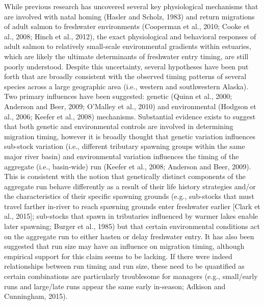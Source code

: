 \documentclass[12pt,]{book}
\theoremstyle{definition}
\theoremstyle{definition}
\theoremstyle{definition}
\theoremstyle{remark}
\begin{document}
While previous research has uncovered several key physiological
mechanisms that are involved with natal homing (Hasler and Scholz, 1983)
and return migrations of adult salmon to freshwater environments
(Cooperman et al., 2010; Cooke et al., 2008; Hinch et al., 2012), the
exact physiological and behavioral responses of adult salmon to
relatively small-scale environmental gradients within estuaries, which
are likely the ultimate determinants of freshwater entry timing, are
still poorly understood. Despite this uncertainty, several hypotheses
have been put forth that are broadly consistent with the observed timing
patterns of several species across a large geographic area (i.e.,
western and southwestern Alaska). Two primary influences have been
suggested: genetic (Quinn et al., 2000; Anderson and Beer, 2009;
O'Malley et al., 2010) and environmental (Hodgson et al., 2006; Keefer
et al., 2008) mechanisms. Substantial evidence exists to suggest that
both genetic and environmental controls are involved in determining
migration timing, however it is broadly thought that genetic variation
influences sub-stock variation (i.e., different tributary spawning
groups within the same major river basin) and environmental variation
influences the timing of the aggregate (i.e., basin-wide) run (Keefer et
al., 2008; Anderson and Beer, 2009). This is consistent with the notion
that genetically distinct components of the aggregate run behave
differently as a result of their life history strategies and/or the
characteristics of their specific spawning grounds (e.g., sub-stocks
that must travel farther in-river to reach spawning grounds enter
freshwater earlier {[}Clark et al., 2015{]}; sub-stocks that spawn in
tributaries influenced by warmer lakes enable later spawning; Burger et
al., 1985) but that certain environmental conditions act on the
aggregate run to either hasten or delay freshwater entry. It has also
been suggested that run size may have an influence on migration timing,
although empirical support for this claim seems to be lacking. If there
were indeed relationships between run timing and run size, these need to
be quantified as certain combinations are particularly troublesome for
managers (e.g., small/early runs and large/late runs appear the same
early in-season; Adkison and Cunningham, 2015).
\end{document}
